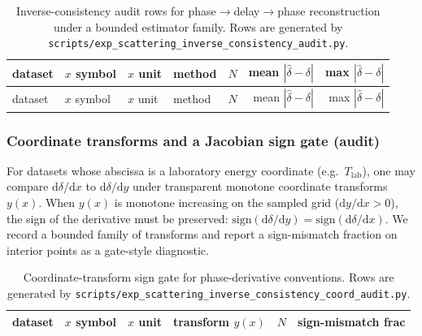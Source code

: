 \begin{center}
\small
\setlength{\tabcolsep}{8pt}
\renewcommand{\arraystretch}{1.15}
\begin{longtable}{llllrrr}
\caption{Inverse-consistency audit rows for phase$\to$delay$\to$phase reconstruction under a bounded estimator family. Rows are generated by \texttt{scripts/exp\_scattering\_inverse\_consistency\_audit.py}.}\label{tab:scattering_inverse_consistency_audit}\\
\toprule
dataset & $x$ symbol & $x$ unit & method & $N$ & mean $|\widehat\delta-\delta|$ & max $|\widehat\delta-\delta|$ \\
\midrule
\endfirsthead
\toprule
dataset & $x$ symbol & $x$ unit & method & $N$ & mean $|\widehat\delta-\delta|$ & max $|\widehat\delta-\delta|$ \\
\midrule
\endhead
%
\end{longtable}
\end{center}

\subsubsection{Coordinate transforms and a Jacobian sign gate (audit)}
\AuditTag For datasets whose abscissa is a laboratory energy coordinate (e.g.\ $T_{\mathrm{lab}}$), one may compare $\mathrm{d}\delta/\mathrm{d}x$ to $\mathrm{d}\delta/\mathrm{d}y$ under transparent monotone coordinate transforms $y(x)$.
When $y(x)$ is monotone increasing on the sampled grid ($\mathrm{d}y/\mathrm{d}x>0$), the sign of the derivative must be preserved: $\mathrm{sign}(\mathrm{d}\delta/\mathrm{d}y)=\mathrm{sign}(\mathrm{d}\delta/\mathrm{d}x)$.
We record a bounded family of transforms and report a sign-mismatch fraction on interior points as a gate-style diagnostic.

\AuditTag %

\begin{table}[H]
\centering
\small
\setlength{\tabcolsep}{10pt}
\renewcommand{\arraystretch}{1.15}
\begin{tabular}{llllrr}
\toprule
dataset & $x$ symbol & $x$ unit & transform $y(x)$ & $N$ & sign-mismatch frac \\
\midrule
%
\end{tabular}
\caption{Coordinate-transform sign gate for phase-derivative conventions. Rows are generated by \texttt{scripts/exp\_scattering\_inverse\_consistency\_coord\_audit.py}.}
\label{tab:scattering_inverse_coord_gate}
\end{table}

